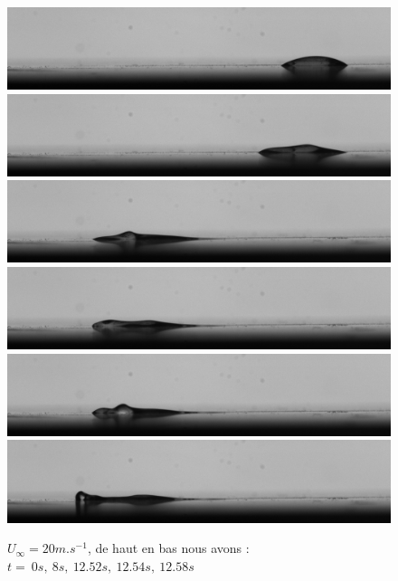 \begin{figure}[!ht]
		\includegraphics[width = \linewidth]{./gfx/test.jpg}
		\includegraphics[width = \linewidth]{./gfx/test400.jpg}
		\includegraphics[width = \linewidth]{./gfx/test626.jpg}
		\includegraphics[width = \linewidth]{./gfx/test627.jpg}
		\includegraphics[width = \linewidth]{./gfx/test628.jpg}
		\includegraphics[width = \linewidth]{./gfx/test629.jpg}
	\caption{$U_{\infty}=20m.s^{-1}$, de haut en bas nous avons :\\
	$t = ~0s,~8s,~12.52s,~12.54s,~12.58s$}
		\label{fig:test}
\end{figure}

